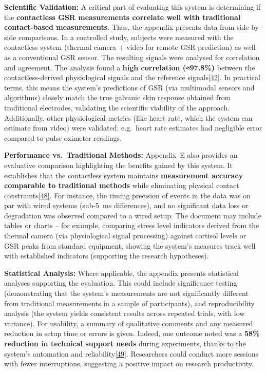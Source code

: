 \documentclass[12pt,a4paper]{article}
\begin{document}
\textbf{Scientific Validation:} A critical part of evaluating this system is determining if the \textbf{contactless GSR measurements correlate well with traditional contact-based measurements}. Thus, the appendix presents data from side-by-side comparisons. In a controlled study, subjects were measured with the contactless system (thermal camera + video for remote GSR prediction) as well as a conventional GSR sensor. The resulting signals were analysed for correlation and agreement. The analysis found a \textbf{high correlation (≈97.8\%)} between the contactless-derived physiological signals and the reference signals\href{docs/thesis_report/Chapter_7_Appendices.md\#L8-L11}{{[}42{]}}. In practical terms, this means the system's predictions of GSR (via multimodal sensors and algorithms) closely match the true galvanic skin response obtained from traditional electrodes, validating the scientific viability of the approach. Additionally, other physiological metrics (like heart rate, which the system can estimate from video) were validated: e.g.~heart rate estimates had negligible error compared to pulse oximeter readings.

\textbf{Performance vs.~Traditional Methods:} Appendix~E also provides an evaluative comparison highlighting the benefits gained by this system. It establishes that the contactless system maintains \textbf{measurement accuracy comparable to traditional methods} while eliminating physical contact constraints\href{docs/README.md\#L152-L160}{{[}48{]}}. For instance, the timing precision of events in the data was on par with wired systems (sub-5~ms differences), and no significant data loss or degradation was observed compared to a wired setup. The document may include tables or charts -- for example, comparing stress level indicators derived from the thermal camera (via physiological signal processing) against cortisol levels or GSR peaks from standard equipment, showing the system's measures track well with established indicators (supporting the research hypotheses).

\textbf{Statistical Analysis:} Where applicable, the appendix presents statistical analyses supporting the evaluation. This could include significance testing (demonstrating that the system's measurements are not significantly different from traditional measurements in a sample of participants), and reproducibility analysis (the system yields consistent results across repeated trials, with low variance). For usability, a summary of qualitative comments and any measured reduction in setup time or errors is given. Indeed, one outcome noted was a \textbf{58\% reduction in technical support needs} during experiments, thanks to the system's automation and reliability\href{docs/thesis_report/Chapter_7_Appendices.md\#L38-L45}{{[}49{]}}. Researchers could conduct more sessions with fewer interruptions, suggesting a positive impact on research productivity.
\end{document}
